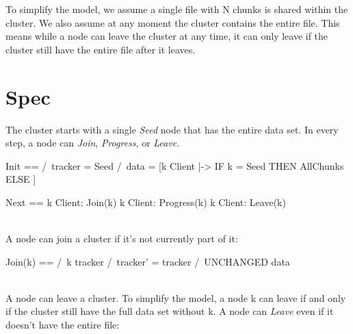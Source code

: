 To simplify the model, we assume a single file with N chunks is shared within
the cluster. We also assume at any moment the cluster contains the entire file.
This means while a node can leave the cluster at any time, it can only leave if
the cluster still have the entire file after it leaves.


\section{Spec}

The cluster starts with a single \textit{Seed} node that has the entire data
set. In every step, a node can \textit{Join}, \textit{Progress}, or
\textit{Leave}.\\

\begin{tla}
Init ==
    /\ tracker = {Seed}
    /\ data = [k \in Client |-> IF k = Seed THEN AllChunks ELSE {}]

Next ==
    \/ \E k \in Client: 
        Join(k) 
    \/ \E k \in Client: 
        Progress(k)
    \/ \E k \in Client: 
        Leave(k)
\end{tla}
\begin{tlatex}
%
%
\@pvspace{8.0pt}%
%
%
%
%
%
%
%
\end{tlatex}
\\

A node can join a cluster if it's not currently part of it:\\
\begin{tla}
Join(k) == 
    /\ k \notin tracker
    /\ tracker' = tracker 
    /\ UNCHANGED data
\end{tla}
\begin{tlatex}
%
%
%
%
\end{tlatex}
\\

A node can leave a cluster. To simplify the model, a node k can leave if and
only if the cluster still have the full data set without k. A node can
\textit{Leave} even if it doesn't have the entire file:\\

